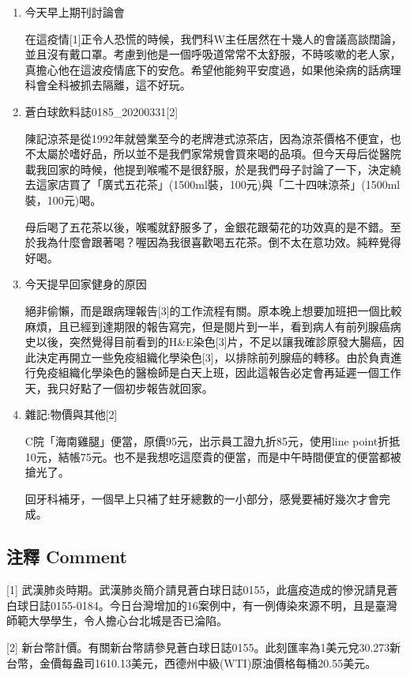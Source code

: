 \documentclass[a5paper, 11pt
]{book}
\begin{document}
\begin{enumerate}
\def\labelenumi{\arabic{enumi}.}
\item
  今天早上期刊討論會

  在這疫情{[}1{]}正令人恐慌的時候，我們科W主任居然在十幾人的會議高談闊論，並且沒有戴口罩。考慮到他是一個呼吸道常常不太舒服，不時咳嗽的老人家，真擔心他在這波疫情底下的安危。希望他能夠平安度過，如果他染病的話病理科會全科被抓去隔離，這不好玩。
\item
  蒼白球飲料誌0185\_20200331{[}2{]}

  陳記涼茶是從1992年就營業至今的老牌港式涼茶店，因為涼茶價格不便宜，也不太屬於嗜好品，所以並不是我們家常規會買來喝的品項。但今天母后從醫院載我回家的時候，他提到喉嚨不是很舒服，於是我們母子討論了一下，決定繞去這家店買了「廣式五花茶」(1500ml裝，100元)與「二十四味涼茶」(1500ml裝，100元)喝。

  母后喝了五花茶以後，喉嚨就舒服多了，金銀花跟菊花的功效真的是不錯。至於我為什麼會跟著喝？喔因為我很喜歡喝五花茶。倒不太在意功效。純粹覺得好喝。
\item
  今天提早回家健身的原因

  絕非偷懶，而是跟病理報告{[}3{]}的工作流程有關。原本晚上想要加班把一個比較麻煩，且已經到達期限的報告寫完，但是閱片到一半，看到病人有前列腺癌病史以後，突然覺得目前看到的H\&E染色{[}3{]}片，不足以讓我確診原發大腸癌，因此決定再開立一些免疫組織化學染色{[}3{]}，以排除前列腺癌的轉移。由於負責進行免疫組織化學染色的醫檢師是白天上班，因此這報告必定會再延遲一個工作天，我只好點了一個初步報告就回家。
\item
  雜記:物價與其他{[}2{]}

  C院「海南雞腿」便當，原價95元，出示員工證九折85元，使用line
  point折抵10元，結帳75元。也不是我想吃這麼貴的便當，而是中午時間便宜的便當都被搶光了。

  回牙科補牙，一個早上只補了蛀牙總數的一小部分，感覺要補好幾次才會完成。
\end{enumerate}

\hypertarget{ux6ce8ux91cb-comment-30}{%
\subsection{注釋 Comment}\label{ux6ce8ux91cb-comment-30}}

{[}1{]}
武漢肺炎時期。武漢肺炎簡介請見蒼白球日誌0155，此瘟疫造成的慘況請見蒼白球日誌0155-0184。今日台灣增加的16案例中，有一例傳染來源不明，且是臺灣師範大學學生，令人擔心台北城是否已淪陷。

{[}2{]}
新台幣計價。有關新台幣請參見蒼白球日誌0155。此刻匯率為1美元兌30.273新台幣，金價每盎司1610.13美元，西德州中級(WTI)原油價格每桶20.55美元。
\end{document}
